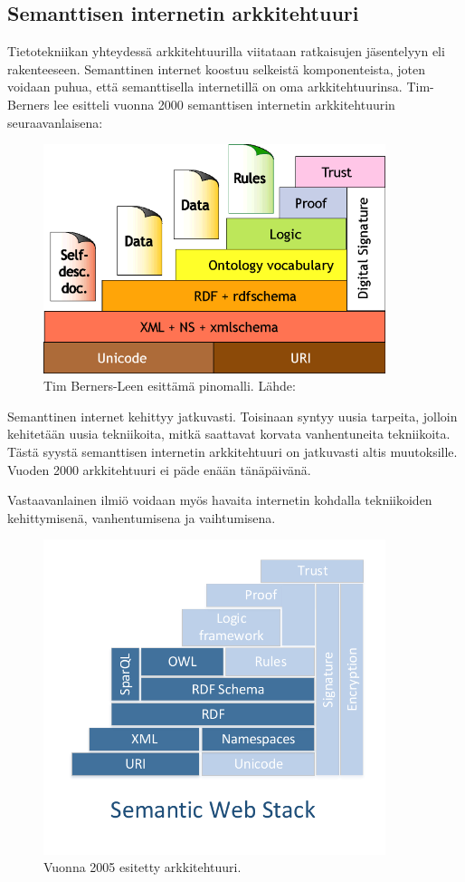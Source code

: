 \documentclass[finnish, 12pt, a4paper, elec, utf8, pdfa, online]{aaltothesis}
\begin{document}
\subsection{Semanttisen internetin arkkitehtuuri}
Tietotekniikan yhteydessä arkkitehtuurilla viitataan ratkaisujen jäsentelyyn eli rakenteeseen. Semanttinen internet koostuu selkeistä komponenteista, joten voidaan puhua, että semanttisella internetillä on oma arkkitehtuurinsa. Tim-Berners lee esitteli vuonna 2000 semanttisen internetin arkkitehtuurin seuraavanlaisena:

\begin{figure}[htb]
\centering
\includegraphics[width=10cm]{images/sweb-stack.png}
\caption{Tim Berners-Leen esittämä pinomalli. Lähde: \cite{stack_bl} \label{images/sweb-stack.png}}
\end{figure}
\clearpage %

Semanttinen internet kehittyy jatkuvasti. Toisinaan syntyy uusia tarpeita, jolloin kehitetään uusia tekniikoita, mitkä saattavat korvata vanhentuneita tekniikoita. Tästä syystä semanttisen internetin arkkitehtuuri on jatkuvasti altis muutoksille. Vuoden 2000 arkkitehtuuri ei päde enään tänäpäivänä.

Vastaavanlainen ilmiö voidaan myös havaita internetin kohdalla tekniikoiden kehittymisenä, vanhentumisena ja vaihtumisena.

\begin{figure}[htb]
\centering
\includegraphics[width=10cm]{images/sweb-stack2.pdf}
\caption{Vuonna 2005 esitetty arkkitehtuuri. \label{images/sweb-stack2.pdf}}
\end{figure}
\end{document}
